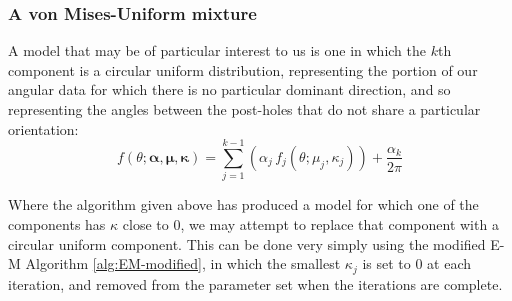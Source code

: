 \documentclass[../../ArchStats.tex]{subfiles}
\begin{document}
\subsubsection{A von Mises-Uniform mixture}
A model that may be of particular interest to us is one in which the $k$th component is a circular uniform distribution, representing the portion of our angular data for which there is no particular dominant direction, and so representing the angles between the post-holes that do not share a particular orientation:
\begin{equation}
f(\theta; \boldsymbol{\alpha, \mu, \kappa}) = \sum_{j=1}^{k-1} \left(\alpha_j \, f_j(\theta; \mu_j, \kappa_j)\right) + \frac{\alpha_k}{2\pi}
\end{equation}


Where the algorithm given above has produced a model for which one of the components has $\kappa$ close to 0, we may attempt to replace that component with a circular uniform component. This can be done very simply using the modified E-M Algorithm \ref{alg:EM-modified}, in which the smallest $\kappa_j$ is set to 0 at each iteration, and removed from the parameter set when the iterations are complete. 
\end{document}
